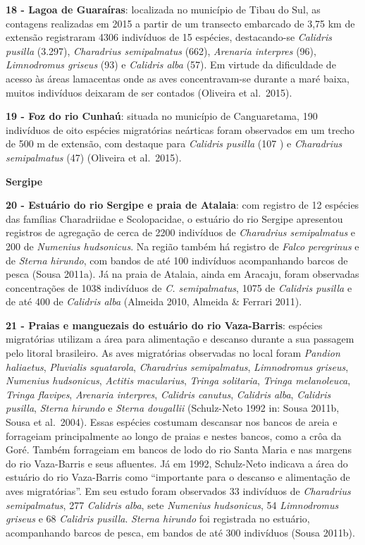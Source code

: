 \documentclass[
  oneside]{scrbook}
\begin{document}
\textbf{18 - Lagoa de Guaraíras}: localizada no município de Tibau do Sul, as contagens realizadas em 2015 a partir de um transecto embarcado de 3,75 km de extensão registraram 4306 indivíduos de 15 espécies, destacando-se \emph{Calidris pusilla} (3.297), \emph{Charadrius semipalmatus} (662), \emph{Arenaria interpres} (96), \emph{Limnodromus griseus} (93) e \emph{Calidris alba} (57). Em virtude da dificuldade de acesso às áreas lamacentas onde as aves concentravam-se durante a maré baixa, muitos indivíduos deixaram de ser contados (Oliveira et al.~2015).

\textbf{19 - Foz do rio Cunhaú}: situada no município de Canguaretama, 190 indivíduos de oito espécies migratórias neárticas foram observados em um trecho de 500 m de extensão, com destaque para \emph{Calidris pusilla} (107 ) e \emph{Charadrius semipalmatus} (47) (Oliveira et al.~2015).

\textbf{Sergipe}

\textbf{20 - Estuário do rio Sergipe e praia de Atalaia}: com registro de 12 espécies das famílias Charadriidae e Scolopacidae, o estuário do rio Sergipe apresentou registros de agregação de cerca de 2200 indivíduos de \emph{Charadrius semipalmatus} e 200 de \emph{Numenius hudsonicus}. Na região também há registro de \emph{Falco peregrinus} e de \emph{Sterna hirundo}, com bandos de até 100 indivíduos acompanhando barcos de pesca (Sousa 2011a). Já na praia de Atalaia, ainda em Aracaju, foram observadas concentrações de 1038 indivíduos de \emph{C. semipalmatus}, 1075 de \emph{Calidris pusilla} e de até 400 de \emph{Calidris alba} (Almeida 2010, Almeida \& Ferrari 2011).

\textbf{21 - Praias e manguezais do estuário do rio Vaza-Barris}: espécies migratórias utilizam a área para alimentação e descanso durante a sua passagem pelo litoral brasileiro. As aves migratórias observadas no local foram \emph{Pandion haliaetus}, \emph{Pluvialis squatarola}, \emph{Charadrius semipalmatus}, \emph{Limnodromus griseus}, \emph{Numenius hudsonicus}, \emph{Actitis macularius}, \emph{Tringa solitaria}, \emph{Tringa melanoleuca}, \emph{Tringa flavipes}, \emph{Arenaria interpres}, \emph{Calidris canutus}, \emph{Calidris alba}, \emph{Calidris pusilla}, \emph{Sterna hirundo} e \emph{Sterna dougallii} (Schulz-Neto 1992 in: Sousa 2011b, Sousa et al.~2004). Essas espécies costumam descansar nos bancos de areia e forrageiam principalmente ao longo de praias e nestes bancos, como a crôa da Goré. Também forrageiam em bancos de lodo do rio Santa Maria e nas margens do rio Vaza-Barris e seus afluentes. Já em 1992, Schulz-Neto indicava a área do estuário do rio Vaza-Barris como ``importante para o descanso e alimentação de aves migratórias''. Em seu estudo foram observados 33 indivíduos de \emph{Charadrius semipalmatus}, 277 \emph{Calidris alba}, sete \emph{Numenius hudsonicus}, 54 \emph{Limnodromus griseus} e 68 \emph{Calidris pusilla}. \emph{Sterna hirundo} foi registrada no estuário, acompanhando barcos de pesca, em bandos de até 300 indivíduos (Sousa 2011b).
\end{document}
